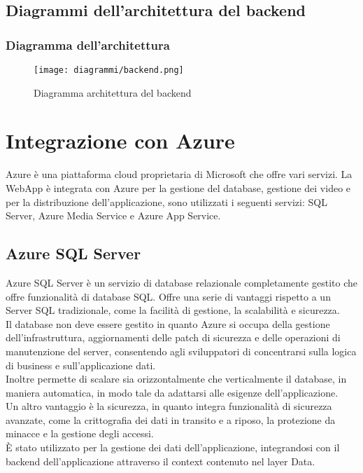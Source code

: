 \subsection{Diagrammi dell'architettura del backend}
\subsubsection{Diagramma dell'architettura}
\begin{figure}[H] 
    \centering 
    \texttt{[image: diagrammi/backend.png]} 
    \caption{Diagramma architettura del backend}
\end{figure}

\section{Integrazione con Azure}
Azure è una piattaforma cloud proprietaria di Microsoft che offre vari servizi.
La WebApp è integrata con Azure per la gestione del database, gestione dei video e per la distribuzione dell'applicazione, sono utilizzati i seguenti servizi: SQL Server, Azure Media Service e Azure App Service.\\

\subsection{Azure SQL Server}
Azure SQL Server è un servizio di database relazionale completamente gestito che offre funzionalità di database SQL.
Offre una serie di vantaggi rispetto a un Server SQL tradizionale, come la facilità di gestione, la scalabilità e sicurezza.\\
Il database non deve essere gestito in quanto Azure si occupa della gestione dell'infrastruttura, aggiornamenti delle patch di sicurezza e delle operazioni di manutenzione del server, consentendo agli sviluppatori di concentrarsi sulla logica di business e sull'applicazione dati.\\
Inoltre permette di scalare sia orizzontalmente che verticalmente il database, in maniera automatica, in modo tale da adattarsi alle esigenze dell'applicazione.\\
Un altro vantaggio è la sicurezza, in quanto integra funzionalità di sicurezza avanzate, come la crittografia dei dati in transito e a riposo, la protezione da minacce e la gestione degli accessi.\\
È stato utilizzato per la gestione dei dati dell'applicazione, integrandosi con il backend dell'applicazione attraverso il context contenuto nel layer Data.\\

